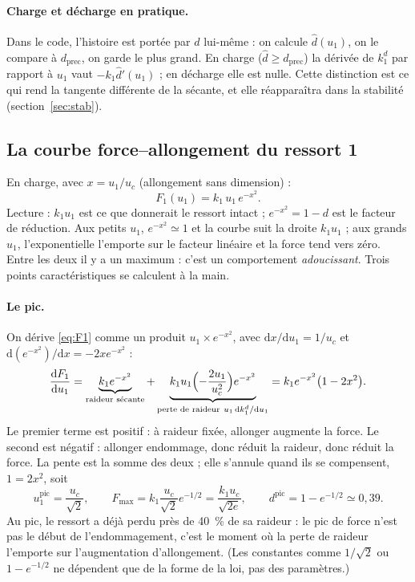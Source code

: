 \documentclass[11pt,a4paper]{article}
\newcommand{\dd}{\mathrm{d}}
\newcommand{\kd}{k_1^{d}}
\newcommand{\uc}{u_c}
\begin{document}
\paragraph{Charge et décharge en pratique.} Dans le code, l'histoire est portée par $d$ lui-même :
on calcule $\hat d(u_1)$, on le compare à $d_{\text{prec}}$, on garde le plus grand. En charge
($\hat d \ge d_{\text{prec}}$) la dérivée de $\kd$ par rapport à $u_1$ vaut $-k_1\hat d'(u_1)$ ; en
décharge elle est nulle. Cette distinction est ce qui rend la tangente différente de la
sécante, et elle réapparaîtra dans la stabilité (section~\ref{sec:stab}).

\subsection{La courbe force--allongement du ressort 1}
En charge, avec $x = u_1/\uc$ (allongement sans dimension) :
\begin{equation}
  F_1(u_1) = k_1\,u_1\,e^{-x^2}.
  \label{eq:F1}
\end{equation}
Lecture : $k_1u_1$ est ce que donnerait le ressort intact ; $e^{-x^2} = 1-d$ est le facteur
de réduction. Aux petits $u_1$, $e^{-x^2}\simeq1$ et la courbe suit la droite $k_1u_1$ ; aux
grands $u_1$, l'exponentielle l'emporte sur le facteur linéaire et la force tend vers zéro.
Entre les deux il y a un maximum : c'est un comportement \emph{adoucissant}. Trois points
caractéristiques se calculent à la main.

\paragraph{Le pic.} On dérive \eqref{eq:F1} comme un produit $u_1\times e^{-x^2}$, avec
$\dd x/\dd u_1 = 1/\uc$ et $\dd(e^{-x^2})/\dd x = -2xe^{-x^2}$ :
\begin{equation}
  \frac{\dd F_1}{\dd u_1} = \underbrace{k_1e^{-x^2}}_{\text{raideur sécante}}
  + \underbrace{k_1u_1\Bigl(-\frac{2u_1}{\uc^2}\Bigr)e^{-x^2}}_{\text{perte de raideur}\ u_1\,\dd\kd/\dd u_1}
  = k_1e^{-x^2}\bigl(1-2x^2\bigr).
  \label{eq:dF1}
\end{equation}
Le premier terme est positif : à raideur fixée, allonger augmente la force. Le second est
négatif : allonger endommage, donc réduit la raideur, donc réduit la force. La pente est la
somme des deux ; elle s'annule quand ils se compensent, $1 = 2x^2$, soit
\begin{equation}
  u_1^{\text{pic}} = \frac{\uc}{\sqrt2},\qquad
  F_{\max} = k_1\frac{\uc}{\sqrt2}e^{-1/2} = \frac{k_1\uc}{\sqrt{2e}},\qquad
  d^{\text{pic}} = 1-e^{-1/2} \simeq 0{,}39 .
\end{equation}
Au pic, le ressort a déjà perdu près de 40~\% de sa raideur : le pic de force n'est pas le début
de l'endommagement, c'est le moment où la perte de raideur l'emporte sur l'augmentation
d'allongement. (Les constantes comme $1/\sqrt2$ ou $1-e^{-1/2}$ ne dépendent que de la forme de
la loi, pas des paramètres.)
\end{document}
